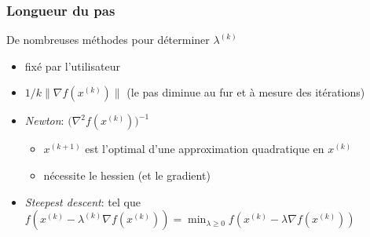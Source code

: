 \begin{frame}
  \frametitle{Longueur du pas}

  \begin{block}{De nombreuses méthodes pour déterminer $\lambda^{(k)}$}
  \begin{itemize}
  \item fixé par l'utilisateur %
  \item $1 / k \|{\nabla f}(x^{(k)})\|$ (le pas diminue au fur et à mesure des itérations)
  \item \emph{Newton}: $\Big( {\nabla^2 f}(x^{(k)}) \Big)^{-1}$
    \begin{itemize}
    \item $x^{(k+1)}$ est l'optimal d'une approximation quadratique en $x^{(k)}$
    \item nécessite le hessien (et le gradient)
    \end{itemize}
  \item \emph{Steepest descent}: tel que $f(x^{(k)} - \lambda^{(k)} {\nabla f}(x^{(k)}))
    = \min_{\lambda \geq 0} f(x^{(k)} - \lambda {\nabla f}(x^{(k)}))$
  \end{itemize}
  \end{block}
\end{frame}

